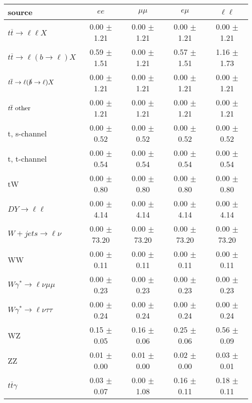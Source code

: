 \begin{tabular}{l|cccc} \hline\hline
source & $ee$ & $\mu\mu$ & $e\mu$ & $\ell\ell $ \\
\hline
$t\overline{t} \rightarrow \ell \ell X$ &  0.00 $\pm$  1.21 &  0.00 $\pm$  1.21 &  0.00 $\pm$  1.21 &  0.00 $\pm$  1.21 \\
$t\overline{t} \rightarrow \ell (b \rightarrow \ell) X$ &  0.59 $\pm$  1.51 &  0.00 $\pm$  1.21 &  0.57 $\pm$  1.51 &  1.16 $\pm$  1.73 \\
$t\overline{t} \rightarrow \ell (\slashed b \rightarrow \ell) X$ &  0.00 $\pm$  1.21 &  0.00 $\pm$  1.21 &  0.00 $\pm$  1.21 &  0.00 $\pm$  1.21 \\
        $t\overline{t}\ \rm{other}$ &  0.00 $\pm$  1.21 &  0.00 $\pm$  1.21 &  0.00 $\pm$  1.21 &  0.00 $\pm$  1.21 \\
\hline
                       t, s-channel &  0.00 $\pm$  0.52 &  0.00 $\pm$  0.52 &  0.00 $\pm$  0.52 &  0.00 $\pm$  0.52 \\
                       t, t-channel &  0.00 $\pm$  0.54 &  0.00 $\pm$  0.54 &  0.00 $\pm$  0.54 &  0.00 $\pm$  0.54 \\
                                 tW &  0.00 $\pm$  0.80 &  0.00 $\pm$  0.80 &  0.00 $\pm$  0.80 &  0.00 $\pm$  0.80 \\
\hline
         $DY \rightarrow \ell \ell$ &  0.00 $\pm$  4.14 &  0.00 $\pm$  4.14 &  0.00 $\pm$  4.14 &  0.00 $\pm$  4.14 \\
      $W+jets \rightarrow \ell \nu$ &  0.00 $\pm$ 73.20 &  0.00 $\pm$ 73.20 &  0.00 $\pm$ 73.20 &  0.00 $\pm$ 73.20 \\
                                 WW &  0.00 $\pm$  0.11 &  0.00 $\pm$  0.11 &  0.00 $\pm$  0.11 &  0.00 $\pm$  0.11 \\
\hline
$W\gamma^{*} \rightarrow \ell \nu \mu\mu$ &  0.00 $\pm$  0.23 &  0.00 $\pm$  0.23 &  0.00 $\pm$  0.23 &  0.00 $\pm$  0.23 \\
$W\gamma^{*} \rightarrow \ell \nu \tau\tau$ &  0.00 $\pm$  0.24 &  0.00 $\pm$  0.24 &  0.00 $\pm$  0.24 &  0.00 $\pm$  0.24 \\
                                 WZ &  0.15 $\pm$  0.05 &  0.16 $\pm$  0.06 &  0.25 $\pm$  0.06 &  0.56 $\pm$  0.09 \\
                                 ZZ &  0.01 $\pm$  0.00 &  0.01 $\pm$  0.00 &  0.02 $\pm$  0.00 &  0.03 $\pm$  0.01 \\
\hline
              $t\overline{t}\gamma$ &  0.03 $\pm$  0.07 &  0.00 $\pm$  1.08 &  0.16 $\pm$  0.11 &  0.18 $\pm$  0.11 \\

\end{tabular}
